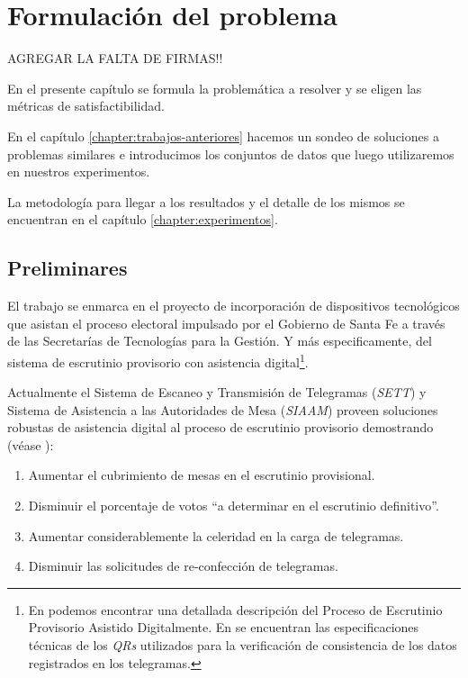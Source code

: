 \chapter{Formulación del problema} \label{formulacion-del-problema}

AGREGAR LA FALTA DE FIRMAS!!

En el presente capítulo se formula la problemática a resolver y se eligen las métricas de satisfactibilidad.

En el capítulo \ref{chapter:trabajos-anteriores} hacemos un sondeo de soluciones a problemas similares e introducimos los conjuntos de datos que luego utilizaremos en nuestros experimentos.

La metodología para llegar a los resultados y el detalle de los mismos se encuentran en el capítulo \ref{chapter:experimentos}.

\section{Preliminares}

El trabajo se enmarca en el proyecto de incorporación de dispositivos tecnológicos que asistan el proceso electoral impulsado por el Gobierno de Santa Fe a través de las Secretarías de Tecnologías para la Gestión. Y más especificamente, del sistema de escrutinio provisorio con asistencia digital\footnote{En \cite{unr1} podemos encontrar una detallada descripción del Proceso de Escrutinio Provisorio Asistido Digitalmente. En \cite{qrs} se encuentran las especificaciones técnicas de los \textit{QRs} utilizados para la verificación de consistencia de los datos registrados en los telegramas.}.

Actualmente el Sistema de Escaneo y Transmisión de Telegramas (\textit{SETT}) y Sistema de Asistencia a las Autoridades de Mesa (\textit{SIAAM}) proveen soluciones robustas de asistencia digital al proceso de escrutinio provisorio demostrando (véase \cite{unr-informe}):
\begin{enumerate}
    \item Aumentar el cubrimiento de mesas en el escrutinio provisional.
    \item Disminuir el porcentaje de votos ``a determinar en el escrutinio definitivo''.
    \item Aumentar considerablemente la celeridad en la carga de telegramas.
    \item  Disminuir las solicitudes de re-confección de telegramas.
\end{enumerate}


